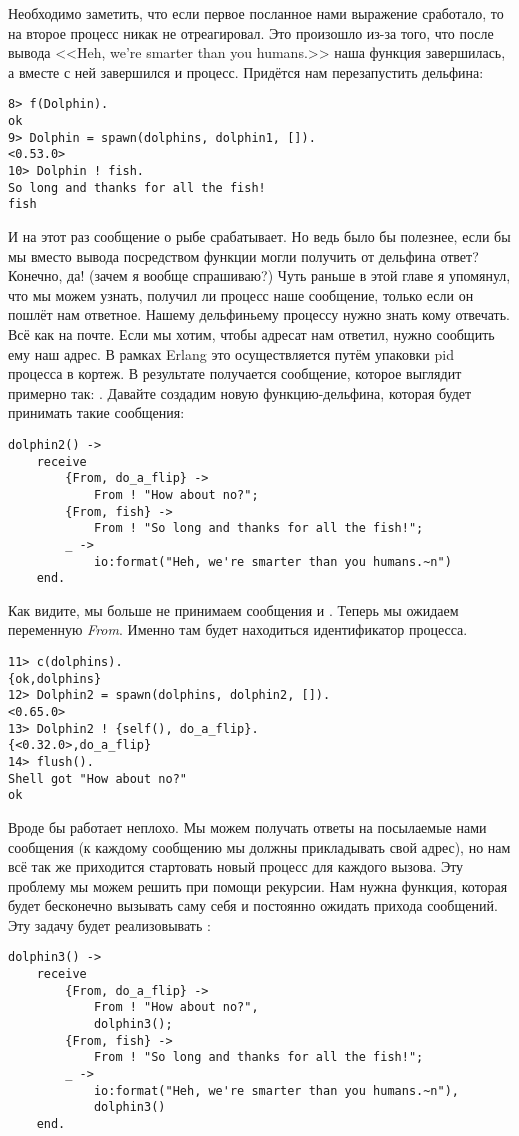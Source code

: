 Необходимо заметить, что если первое посланное нами выражение сработало, то на второе процесс  никак не отреагировал.
Это произошло из\--за того, что после вывода <<Heh, we're smarter than you humans.>> наша функция завершилась, а вместе с ней завершился и процесс.
Придётся нам перезапустить дельфина:
\begin{lstlisting}[style=erlang]
8> f(Dolphin).   
ok
9> Dolphin = spawn(dolphins, dolphin1, []).
<0.53.0>
10> Dolphin ! fish.
So long and thanks for all the fish!
fish
\end{lstlisting}

И на этот раз сообщение о рыбе срабатывает.
Но ведь было бы полезнее, если бы мы вместо вывода посредством функции  могли получить от дельфина ответ?
Конечно, да! (зачем я вообще спрашиваю?)
Чуть раньше в этой главе я упомянул, что мы можем узнать, получил ли процесс наше сообщение, только если он пошлёт нам ответное.
Нашему дельфиньему процессу нужно знать кому отвечать.
Всё как на почте.
Если мы хотим, чтобы адресат нам ответил, нужно сообщить ему наш адрес.
В рамках Erlang это осуществляется путём упаковки pid процесса в кортеж.
В результате получается сообщение, которое выглядит примерно так: .
Давайте создадим новую функцию\--дельфина, которая будет принимать такие сообщения:
\begin{lstlisting}[style=erlang]
dolphin2() ->
    receive
        {From, do_a_flip} ->
            From ! "How about no?";
        {From, fish} ->
            From ! "So long and thanks for all the fish!";
        _ ->
            io:format("Heh, we're smarter than you humans.~n")
    end.
\end{lstlisting}

Как видите, мы больше не принимаем сообщения   и . Теперь мы ожидаем переменную \emph{From}.
Именно там будет находиться идентификатор процесса.
\begin{lstlisting}[style=erlang]
11> c(dolphins).
{ok,dolphins}
12> Dolphin2 = spawn(dolphins, dolphin2, []).
<0.65.0>
13> Dolphin2 ! {self(), do_a_flip}.         
{<0.32.0>,do_a_flip}
14> flush().
Shell got "How about no?"
ok
\end{lstlisting}

Вроде бы работает неплохо.
Мы можем получать ответы на посылаемые нами сообщения (к каждому сообщению мы должны прикладывать свой адрес), но нам всё так же приходится стартовать новый процесс для каждого вызова.
Эту проблему мы можем решить при помощи рекурсии.
Нам нужна функция, которая будет бесконечно вызывать саму себя и постоянно ожидать прихода сообщений.
Эту задачу будет реализовывать :
\begin{lstlisting}[style=erlang]
dolphin3() ->
    receive
        {From, do_a_flip} ->
            From ! "How about no?",
            dolphin3();
        {From, fish} ->
            From ! "So long and thanks for all the fish!";
        _ ->
            io:format("Heh, we're smarter than you humans.~n"),
            dolphin3()
    end.
\end{lstlisting}

